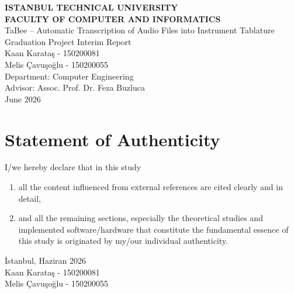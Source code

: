 \documentclass[a4paper, 12pt, titlepage]{article}
\title{\thetitle}
\author{\theauthor}
\date{\thedate}
\newcommand{\thetitle}{TaBee – Automatic Transcription of Audio Files into Instrument Tablature}
\newcommand{\theauthor}{Kaan Karataş - 150200081 \\ Melis Çavuşoğlu - 150200055}
\begin{document}
\shorthandoff{=}


\begin{titlepage}
    \bfseries %
    \sffamily %
    \begin{center}
        \LARGE{\textbf{ISTANBUL TECHNICAL UNIVERSITY \\ 
               FACULTY OF COMPUTER AND INFORMATICS} } \\
        \vspace{5.5cm}
        \LARGE{\thetitle}  \\
        \vspace{4.0cm}
        \Large{Graduation Project Interim Report} \\
        \vspace{0.5cm}
        \Large{\theauthor} \\
        \vspace{4cm}
        \large{Department: Computer Engineering} \\
        \vspace{1.5cm}
        \large{Advisor: Assoc. Prof. Dr. Feza Buzluca} \\
        \vspace{\fill} %
        \large{\normalfont \sffamily June 2026}
    \end{center}
\end{titlepage}

\newpage
\section*{Statement of Authenticity}
I/we hereby declare that in this study
\begin{enumerate}
    \item all the content influenced from external references are cited clearly and in detail,
    \item and all the remaining sections, especially the theoretical studies and implemented software/hardware that constitute the fundamental essence of this study is originated by my/our individual authenticity.
\end{enumerate}
\vspace{1em}
İstanbul, Haziran 2026
\vspace{3em}\\ \theauthor
\end{document}
